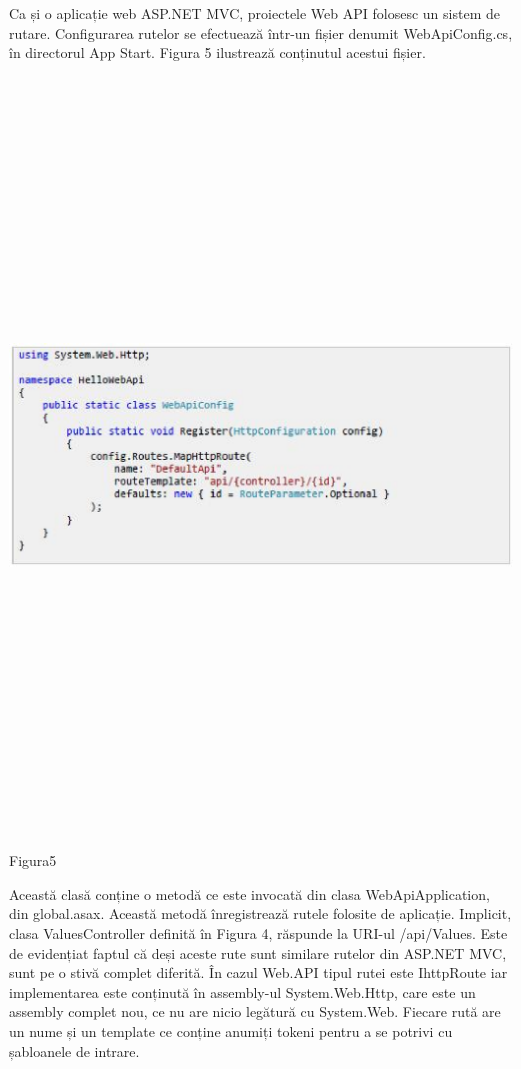 Ca și o aplicație web ASP.NET MVC, proiectele Web API folosesc un sistem de rutare. Configurarea rutelor se efectuează într-un fișier denumit WebApiConfig.cs, în directorul App Start. Figura 5 ilustrează conținutul acestui fișier.
\begin{center}
\includegraphics[width=15cm,height=20cm]{imagini/start.eps} 
\caption{Figura5}
\end{center}

Această clasă conține o metodă ce este invocată din clasa WebApiApplication, din global.asax. Această metodă înregistrează rutele folosite de aplicație. Implicit, clasa ValuesController definită în Figura 4, răspunde la URI-ul /api/Values. Este de evidențiat faptul că deși aceste rute sunt similare rutelor din ASP.NET MVC, sunt pe o stivă complet diferită. În cazul Web.API tipul rutei este IhttpRoute iar implementarea este conținută în assembly-ul System.Web.Http, care este un assembly complet nou, ce nu are nicio legătură cu System.Web.
Fiecare rută are un nume și un template ce conține anumiți tokeni pentru a se potrivi cu șabloanele de intrare.

